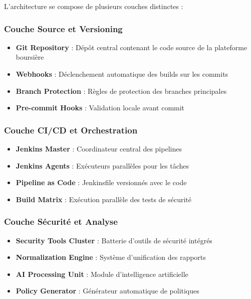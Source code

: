 \documentclass[12pt,a4paper]{report}
\begin{document}
L'architecture se compose de plusieurs couches distinctes :

\subsubsection{Couche Source et Versioning}
\begin{itemize}
    \item \textbf{Git Repository} : Dépôt central contenant le code source de la plateforme boursière
    \item \textbf{Webhooks} : Déclenchement automatique des builds sur les commits
    \item \textbf{Branch Protection} : Règles de protection des branches principales
    \item \textbf{Pre-commit Hooks} : Validation locale avant commit
\end{itemize}

\subsubsection{Couche CI/CD et Orchestration}
\begin{itemize}
    \item \textbf{Jenkins Master} : Coordinateur central des pipelines
    \item \textbf{Jenkins Agents} : Exécuteurs parallèles pour les tâches
    \item \textbf{Pipeline as Code} : Jenkinsfile versionnés avec le code
    \item \textbf{Build Matrix} : Exécution parallèle des tests de sécurité
\end{itemize}

\subsubsection{Couche Sécurité et Analyse}
\begin{itemize}
    \item \textbf{Security Tools Cluster} : Batterie d'outils de sécurité intégrés
    \item \textbf{Normalization Engine} : Système d'unification des rapports
    \item \textbf{AI Processing Unit} : Module d'intelligence artificielle
    \item \textbf{Policy Generator} : Générateur automatique de politiques
\end{itemize}
\end{document}
